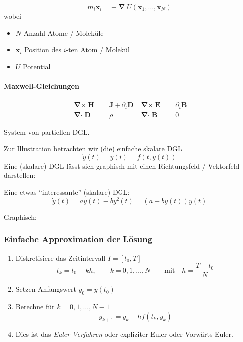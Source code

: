 \documentclass[a4paper]{article}
\renewcommand{\vec}[1]{\mathbf{\bm{#1}}}
\DeclareMathOperator{\dotp}{\boldsymbol\cdot}
\DeclareMathOperator{\crossp}{\boldsymbol\times}
\DeclareMathOperator{\grad}{\vec{\nabla}}
\DeclareMathOperator{\divg}{\vec{\nabla}\dotp}
\DeclareMathOperator{\curl}{\vec{\nabla}\crossp}
\begin{document}
\[
  m_i \ddot{\vec{x}}_i = - \grad U(\vec{x}_1, \ldots, \vec{x}_N)
\]
wobei
\begin{itemize}
  \item $N$ Anzahl Atome / Moleküle
  \item $\vec{x}_i$ Position des $i$-ten Atom / Molekül
  \item $U$ Potential
\end{itemize}

\paragraph{Maxwell-Gleichungen}
\begin{align*}
  \curl \vec{H} &= \vec{J} + \partial_t \vec{D} &
  \curl \vec{E} &= \partial_t \vec{B} \\
  \divg \vec{D} &= \rho &
  \divg \vec{B} &= 0 
\end{align*}

System von partiellen DGL.

Zur Illustration betrachten wir (die) einfache skalare DGL
\[
  \dot{y}(t) = y(t) = f(t, y(t))
\]
Eine (skalare) DGL lässt sich graphisch mit einen Richtungsfeld / Vektorfeld
darstellen:
\begin{center}
  \skelfig
\end{center}

Eine etwas ``interessante'' (skalare) DGL:
\[
  \dot{y}(t) = ay(t) - by^2(t) = (a - by(t)) y(t)
\]

Graphisch:
\begin{center}
  \skelfig
\end{center}

\subsubsection*{Einfache Approximation der Lösung}

\begin{enumerate}[(1)]
  \item Diskretisiere das Zeitintervall $I = [t_0, T]$
    \[
      t_k = t_0 + kh, \qquad k = 0, 1, \ldots, N
      \qquad \text{mit} \quad
      h = \frac{T - t_0}{N}
    \]
  \item Setzen Anfangswert $y_0 = y(t_0)$
  \item Berechne für $k = 0, 1, \ldots, N-1$
    \[
      y_{k+1} = y_k + h f(t_k, y_k)
    \]
  \item Dies ist das \emph{Euler Verfahren} oder expliziter Euler oder
    Vorwärts Euler.
\end{enumerate}
\end{document}
